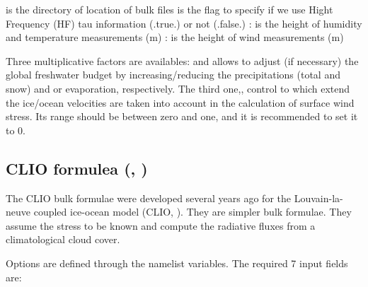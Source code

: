 \documentclass[../main/NEMO_manual]{subfiles}
\begin{document}
 is the directory of location of bulk files
 is the flag to specify if we use Hight Frequency (HF) tau information (.true.) or not (.false.)
: is the height of humidity and temperature measurements (m)
: is the height of wind measurements (m)

Three multiplicative factors are availables: 
 and  allows to adjust (if necessary) the global freshwater budget by
increasing/reducing the precipitations (total and snow) and or evaporation, respectively.
The third one,, control to which extend the ice/ocean velocities are taken into account in
the calculation of surface wind stress.
Its range should be between zero and one, and it is recommended to set it to 0.

\subsection{CLIO formulea (\protect{}, \protect{})}
\label{subsec:SBC_blk_clio}
%

The CLIO bulk formulae were developed several years ago for the Louvain-la-neuve coupled ice-ocean model
(CLIO, \cite{Goosse_al_JGR99}). 
They are simpler bulk formulae.
They assume the stress to be known and compute the radiative fluxes from a climatological cloud cover. 

Options are defined through the   namelist variables.
The required 7 input fields are:
\end{document}
